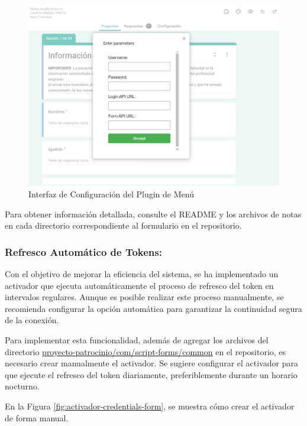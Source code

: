 \begin{figure}[H]
    \centering
    \includegraphics[width=1\linewidth]{fig/forms-menu-parametros.png}
    \caption{Interfaz de Configuración del Plugin de Menú}
    \label{fig:froms-menu-parameters}
\end{figure}

Para obtener información detallada, consulte el README y los archivos de notas en cada directorio correspondiente al formulario en el repositorio.

\subsubsection{Refresco Automático de Tokens:}\label{subsubsec:refresh-token}

Con el objetivo de mejorar la eficiencia del sistema, se ha implementado un activador que ejecuta automáticamente el proceso de refresco del token en intervalos regulares. Aunque es posible realizar este proceso manualmente, se recomienda configurar la opción automática para garantizar la continuidad segura de la conexión.

Para implementar esta funcionalidad, además de agregar los archivos del directorio \href{https://github.com/proyecto-patrocinio/proyecto-patrocinio/tree/main/com/script-forms/common}{proyecto-patrocinio/com/script-forms/common} en el repositorio, es necesario crear manualmente el activador. Se sugiere configurar el activador para que ejecute el refresco del token diariamente, preferiblemente durante un horario nocturno.

En la Figura \ref{fig:activador-credentials-form}, se muestra cómo crear el activador de forma manual.

